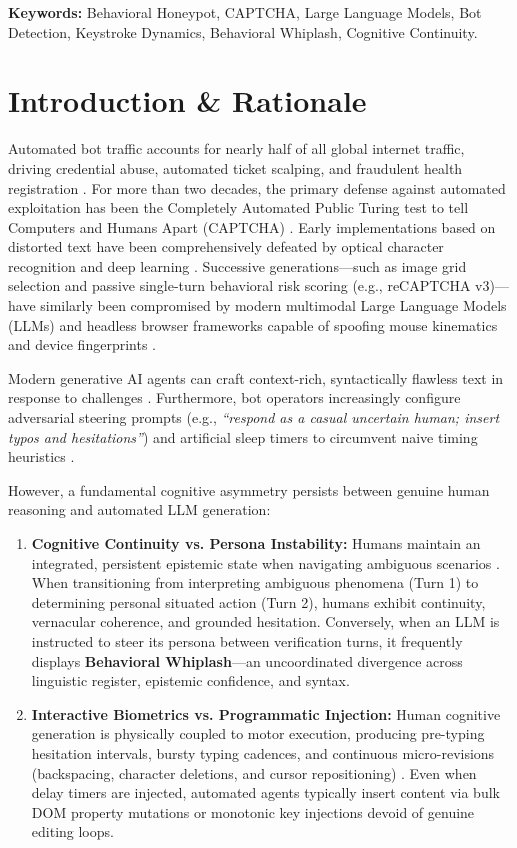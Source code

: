 \documentclass[10pt,a4paper]{article}
\begin{document}
\noindent\textbf{Keywords:} Behavioral Honeypot, CAPTCHA, Large Language Models, Bot Detection, Keystroke Dynamics, Behavioral Whiplash, Cognitive Continuity.

\section*{Introduction \& Rationale}
Automated bot traffic accounts for nearly half of all global internet traffic, driving credential abuse, automated ticket scalping, and fraudulent health registration \cite{badbot2024}. For more than two decades, the primary defense against automated exploitation has been the Completely Automated Public Turing test to tell Computers and Humans Apart (CAPTCHA) \cite{vonahn2003captcha}. Early implementations based on distorted text have been comprehensively defeated by optical character recognition and deep learning \cite{sivakorn2016robot}. Successive generations---such as image grid selection and passive single-turn behavioral risk scoring (e.g., reCAPTCHA v3)---have similarly been compromised by modern multimodal Large Language Models (LLMs) and headless browser frameworks capable of spoofing mouse kinematics and device fingerprints \cite{akrout2023breaking, hesselman2024bot}.

Modern generative AI agents can craft context-rich, syntactically flawless text in response to challenges \cite{kirchenbauer2023watermark}. Furthermore, bot operators increasingly configure adversarial steering prompts (e.g., \textit{``respond as a casual uncertain human; insert typos and hesitations''}) and artificial sleep timers to circumvent naive timing heuristics \cite{mitchell2023detectgpt}.

However, a fundamental cognitive asymmetry persists between genuine human reasoning and automated LLM generation:
\begin{enumerate}
    \item \textbf{Cognitive Continuity vs. Persona Instability:} Humans maintain an integrated, persistent epistemic state when navigating ambiguous scenarios \cite{tversky1974judgment}. When transitioning from interpreting ambiguous phenomena (Turn 1) to determining personal situated action (Turn 2), humans exhibit continuity, vernacular coherence, and grounded hesitation. Conversely, when an LLM is instructed to steer its persona between verification turns, it frequently displays \textbf{Behavioral Whiplash}---an uncoordinated divergence across linguistic register, epistemic confidence, and syntax.
    \item \textbf{Interactive Biometrics vs. Programmatic Injection:} Human cognitive generation is physically coupled to motor execution, producing pre-typing hesitation intervals, bursty typing cadences, and continuous micro-revisions (backspacing, character deletions, and cursor repositioning) \cite{monrose2000keystroke}. Even when delay timers are injected, automated agents typically insert content via bulk DOM property mutations or monotonic key injections devoid of genuine editing loops.
\end{enumerate}
\end{document}

